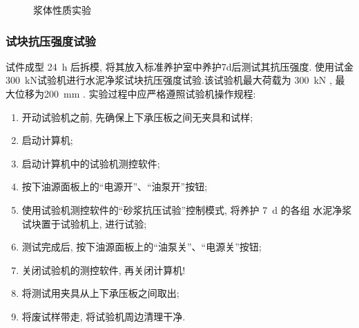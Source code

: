 \begin{figure}
    \centering
    \quad
    \caption{浆体性质实验}
\end{figure}

\subsubsection{试块抗压强度试验}
试件成型 \SI{24}{\hour} 后拆模, 将其放入标准养护室中养护7d后测试其抗压强度.
使用试金\SI{300}{\kilo\newton}试验机进行水泥净浆试块抗压强度试验.该试验机最大荷载为 \SI{300}{\kilo\newton} , 最大位移为\SI{200}{\milli\meter} .
实验过程中应严格遵照试验机操作规程: 
\begin{enumerate}[wide, labelwidth=!, labelindent=0pt]
    \item 开动试验机之前, 先确保上下承压板之间无夹具和试样; 
    \item 启动计算机; 
    \item 启动计算机中的试验机测控软件; 
    \item 按下油源面板上的“电源开”、“油泵开”按钮; 
    \item 使用试验机测控软件的“砂浆抗压试验”控制模式, 将养护 \SI{7}{\day} 的各组  水泥净浆试块置于试验机上, 进行试验; 
    \item 测试完成后, 按下油源面板上的“油泵关”、“电源关”按钮; 
    \item 关闭试验机的测控软件, 再关闭计算机! 
    \item 将测试用夹具从上下承压板之间取出; 
    \item 将废试样带走, 将试验机周边清理干净.
\end{enumerate}

